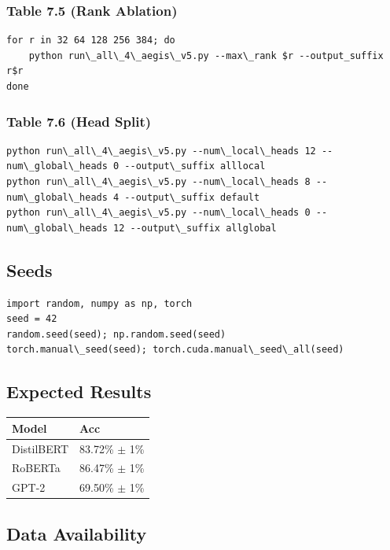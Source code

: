 \subsubsection{Table 7.5 (Rank Ablation)}
\begin{lstlisting}
for r in 32 64 128 256 384; do
    python run\_all\_4\_aegis\_v5.py --max\_rank $r --output_suffix r$r
done
\end{lstlisting}

\subsubsection{Table 7.6 (Head Split)}
\begin{lstlisting}
python run\_all\_4\_aegis\_v5.py --num\_local\_heads 12 --num\_global\_heads 0 --output\_suffix alllocal
python run\_all\_4\_aegis\_v5.py --num\_local\_heads 8 --num\_global\_heads 4 --output\_suffix default
python run\_all\_4\_aegis\_v5.py --num\_local\_heads 0 --num\_global\_heads 12 --output\_suffix allglobal
\end{lstlisting}

\subsection{Seeds}

\begin{lstlisting}
import random, numpy as np, torch
seed = 42
random.seed(seed); np.random.seed(seed)
torch.manual\_seed(seed); torch.cuda.manual\_seed\_all(seed)
\end{lstlisting}

\subsection{Expected Results}

\begin{table}[H]
\centering
\small
\begin{tabular}{ll}
\toprule
\textbf{Model} & \textbf{Acc} \\
\midrule
DistilBERT & 83.72\% $\pm$ 1\% \\
RoBERTa & 86.47\% $\pm$ 1\% \\
GPT-2 & 69.50\% $\pm$ 1\% \\
\bottomrule
\end{tabular}
\end{table}

\subsection{Data Availability}


